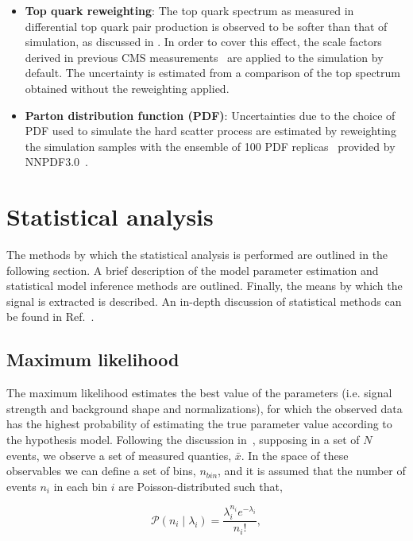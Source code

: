 \begin{itemize}
\item \textbf{Top quark \pt reweighting}: 
The top quark \pt spectrum as measured in differential top quark pair production is observed to be softer than that of simulation, as discussed in . In order to cover this effect, the scale factors derived in previous CMS measurements~\cite{Khachatryan:2016mnb} are applied to the \ttbar simulation by default. The uncertainty is estimated from a comparison of the top \pt spectrum obtained without the reweighting applied.
\item \textbf{Parton distribution function (PDF)}: Uncertainties due to the choice of PDF used to simulate the hard scatter process are estimated by reweighting the simulation samples with the ensemble of 100 PDF replicas~\cite{0954-3899-43-2-023001} provided by NNPDF3.0~\cite{Ball:2014uwa}.
\end{itemize}


\section{Statistical analysis}
\label{sec:stats}
The methods by which the statistical analysis is performed are outlined in the following section. A brief description of the model parameter estimation and statistical model inference methods are outlined. Finally, the means by which the signal is extracted is described. An in-depth discussion of statistical methods can be found in Ref.~\cite{Lista:2016chp}. 

\subsection{Maximum likelihood}
\label{subsec:maxlikelihood}
The maximum likelihood estimates the best value of the parameters (i.e. signal strength and background shape and normalizations), for which the observed data has the highest probability of estimating the true parameter value according to the hypothesis model. Following the discussion in~\cite{Lista:2016chp}, supposing in a set of $N$ events, we observe a set of measured quanties, $\bar{x}$. In the space of these observables we can define a set of bins, $n_{bin}$, and it is assumed that the number of events $n_{i}$ in each bin $i$ are Poisson-distributed such that,

\begin{equation}
  \mathcal{P}(n_{i}\mid\lambda_{i}) = \frac{\lambda_{i}^{n_{i}}e^{-\lambda_{i}}}{n_{i}!},
\end{equation}

